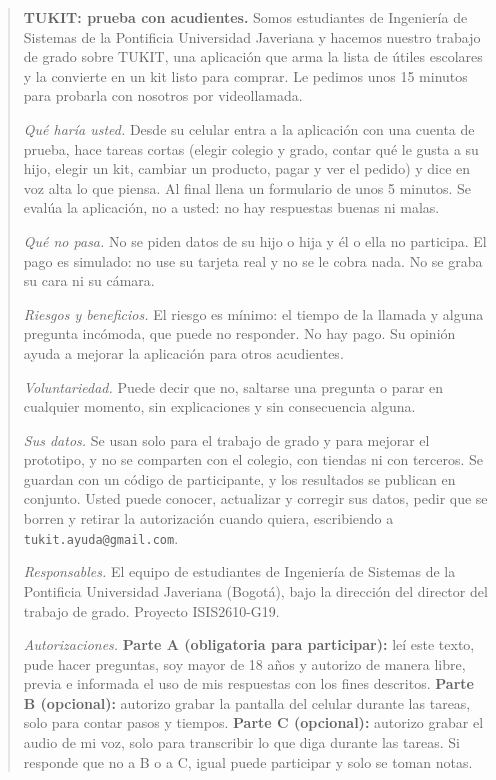 \begin{quote}\small
\textbf{TUKIT: prueba con acudientes.} Somos estudiantes de Ingeniería de Sistemas de la Pontificia Universidad Javeriana y hacemos nuestro trabajo de grado sobre TUKIT, una aplicación que arma la lista de útiles escolares y la convierte en un kit listo para comprar. Le pedimos unos 15 minutos para probarla con nosotros por videollamada.

\emph{Qué haría usted.} Desde su celular entra a la aplicación con una cuenta de prueba, hace tareas cortas (elegir colegio y grado, contar qué le gusta a su hijo, elegir un kit, cambiar un producto, pagar y ver el pedido) y dice en voz alta lo que piensa. Al final llena un formulario de unos 5 minutos. Se evalúa la aplicación, no a usted: no hay respuestas buenas ni malas.

\emph{Qué no pasa.} No se piden datos de su hijo o hija y él o ella no participa. El pago es simulado: no use su tarjeta real y no se le cobra nada. No se graba su cara ni su cámara.

\emph{Riesgos y beneficios.} El riesgo es mínimo: el tiempo de la llamada y alguna pregunta incómoda, que puede no responder. No hay pago. Su opinión ayuda a mejorar la aplicación para otros acudientes.

\emph{Voluntariedad.} Puede decir que no, saltarse una pregunta o parar en cualquier momento, sin explicaciones y sin consecuencia alguna.

\emph{Sus datos.} Se usan solo para el trabajo de grado y para mejorar el prototipo, y no se comparten con el colegio, con tiendas ni con terceros. Se guardan con un código de participante, y los resultados se publican en conjunto. Usted puede conocer, actualizar y corregir sus datos, pedir que se borren y retirar la autorización cuando quiera, escribiendo a \texttt{tukit.ayuda@gmail.com}.

\emph{Responsables.} El equipo de estudiantes de Ingeniería de Sistemas de la Pontificia Universidad Javeriana (Bogotá), bajo la dirección del director del trabajo de grado. Proyecto ISIS2610-G19.

\emph{Autorizaciones.} \textbf{Parte A (obligatoria para participar):} leí este texto, pude hacer preguntas, soy mayor de 18 años y autorizo de manera libre, previa e informada el uso de mis respuestas con los fines descritos. \textbf{Parte B (opcional):} autorizo grabar la pantalla del celular durante las tareas, solo para contar pasos y tiempos. \textbf{Parte C (opcional):} autorizo grabar el audio de mi voz, solo para transcribir lo que diga durante las tareas. Si responde que no a B o a C, igual puede participar y solo se toman notas.
\end{quote}

